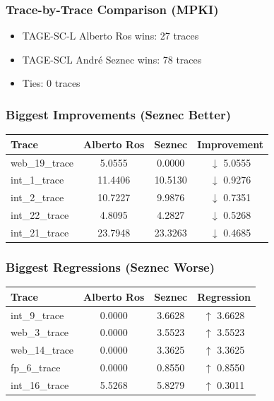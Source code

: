 \documentclass[11pt,a4paper]{article}
\begin{document}
\subsubsection{Trace-by-Trace Comparison (MPKI)}
\begin{itemize}
    \item TAGE-SC-L Alberto Ros wins: 27 traces
    \item TAGE-SCL André Seznec wins: 78 traces
    \item Ties: 0 traces
\end{itemize}

\subsubsection{Biggest Improvements (Seznec Better)}
\begin{table}[h]
\centering
\begin{tabular}{lccc}
\toprule
\textbf{Trace} & \textbf{Alberto Ros} & \textbf{Seznec} & \textbf{Improvement} \\
\midrule
web\_19\_trace  & 5.0555  & 0.0000  & $\downarrow$ 5.0555 \\
int\_1\_trace   & 11.4406 & 10.5130 & $\downarrow$ 0.9276 \\
int\_2\_trace   & 10.7227 & 9.9876  & $\downarrow$ 0.7351 \\
int\_22\_trace  & 4.8095  & 4.2827  & $\downarrow$ 0.5268 \\
int\_21\_trace  & 23.7948 & 23.3263 & $\downarrow$ 0.4685 \\
\bottomrule
\end{tabular}
\end{table}

\subsubsection{Biggest Regressions (Seznec Worse)}
\begin{table}[h]
\centering
\begin{tabular}{lccc}
\toprule
\textbf{Trace} & \textbf{Alberto Ros} & \textbf{Seznec} & \textbf{Regression} \\
\midrule
int\_9\_trace   & 0.0000 & 3.6628 & $\uparrow$ 3.6628 \\
web\_3\_trace   & 0.0000 & 3.5523 & $\uparrow$ 3.5523 \\
web\_14\_trace  & 0.0000 & 3.3625 & $\uparrow$ 3.3625 \\
fp\_6\_trace    & 0.0000 & 0.8550 & $\uparrow$ 0.8550 \\
int\_16\_trace  & 5.5268 & 5.8279 & $\uparrow$ 0.3011 \\
\bottomrule
\end{tabular}
\end{table}
\end{document}
